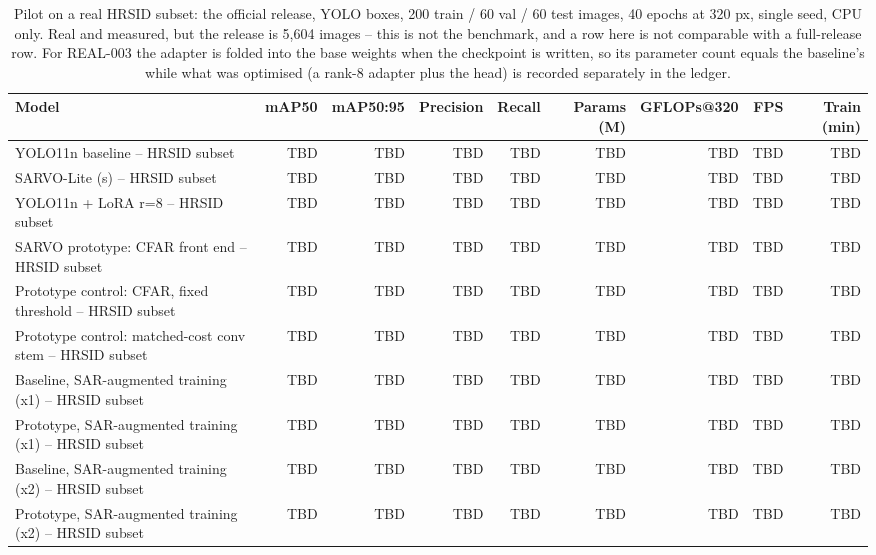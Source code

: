 \begin{table}[t]
\centering
\caption{Pilot on a real HRSID subset: the official release, YOLO boxes, 200 train / 60 val / 60 test images, 40 epochs at 320 px, single seed, CPU only. Real and measured, but the release is 5,604 images -- this is not the benchmark, and a row here is not comparable with a full-release row. For REAL-003 the adapter is folded into the base weights when the checkpoint is written, so its parameter count equals the baseline's while what was optimised (a rank-8 adapter plus the head) is recorded separately in the ledger.}
\label{tab:real_data_pilot}
\begin{tabular}{lrrrrrrrr}
\toprule
Model & mAP50 & mAP50:95 & Precision & Recall & Params (M) & GFLOPs@320 & FPS & Train (min) \\
\midrule
YOLO11n baseline -- HRSID subset & TBD & TBD & TBD & TBD & TBD & TBD & TBD & TBD \\
SARVO-Lite (s) -- HRSID subset & TBD & TBD & TBD & TBD & TBD & TBD & TBD & TBD \\
YOLO11n + LoRA r=8 -- HRSID subset & TBD & TBD & TBD & TBD & TBD & TBD & TBD & TBD \\
SARVO prototype: CFAR front end -- HRSID subset & TBD & TBD & TBD & TBD & TBD & TBD & TBD & TBD \\
Prototype control: CFAR, fixed threshold -- HRSID subset & TBD & TBD & TBD & TBD & TBD & TBD & TBD & TBD \\
Prototype control: matched-cost conv stem -- HRSID subset & TBD & TBD & TBD & TBD & TBD & TBD & TBD & TBD \\
Baseline, SAR-augmented training (x1) -- HRSID subset & TBD & TBD & TBD & TBD & TBD & TBD & TBD & TBD \\
Prototype, SAR-augmented training (x1) -- HRSID subset & TBD & TBD & TBD & TBD & TBD & TBD & TBD & TBD \\
Baseline, SAR-augmented training (x2) -- HRSID subset & TBD & TBD & TBD & TBD & TBD & TBD & TBD & TBD \\
Prototype, SAR-augmented training (x2) -- HRSID subset & TBD & TBD & TBD & TBD & TBD & TBD & TBD & TBD \\
\bottomrule
\end{tabular}
\end{table}
